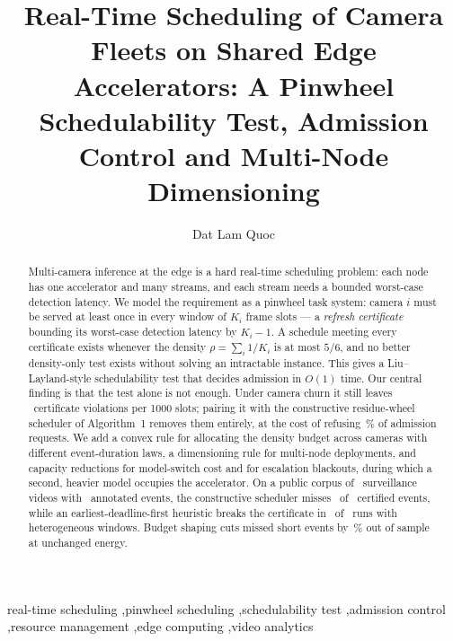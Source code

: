 \documentclass[final,5p,times,twocolumn]{elsarticle}
\theoremstyle{definition}
\newcommand{\Ki}{K_i}
\newcommand{\dens}{\rho}
\begin{document}
\begin{frontmatter}

\title{Real-Time Scheduling of Camera Fleets on Shared Edge Accelerators:
A Pinwheel Schedulability Test, Admission Control and Multi-Node Dimensioning}

\author[fsb]{Dat Lam Quoc}
\address[fsb]{FPT School of Business and Technology, FPT University,
Ho Chi Minh City, Viet Nam}

\begin{abstract}
Multi-camera inference at the edge is a hard real-time scheduling problem: each node has one
accelerator and many streams, and each stream needs a bounded worst-case detection latency. We
model the requirement as a pinwheel task system: camera $i$ must be served at least once in
every window of $\Ki$ frame slots --- a \emph{refresh certificate} bounding its worst-case
detection latency by $\Ki-1$. A schedule meeting every certificate exists whenever the density
$\dens=\sum_i 1/\Ki$ is at most $5/6$, and no better density-only test exists without solving an
intractable instance. This gives a Liu--Layland-style schedulability test that decides admission
in $O(1)$ time. Our central finding is that the test
alone is not enough. Under camera churn it still leaves \numEfiveDensViol\ certificate violations
per 1000 slots; pairing it with the constructive residue-wheel scheduler of Algorithm~1
removes them entirely, at
the cost of refusing \numEfiveResRej\,\% of admission requests. We add a convex rule for
allocating the density budget across cameras with different event-duration laws, a dimensioning
rule for multi-node deployments, and capacity reductions for model-switch cost and for
escalation blackouts, during which a second, heavier model occupies the accelerator. On a public
corpus of \numVideos\
surveillance videos with \numEvents\ annotated events, the constructive scheduler misses
\numEtwoCertMissed\ of \numEtwoCertTotal\ certified events, while an earliest-deadline-first
heuristic breaks the certificate
in \numEtwoEdfHetViolRuns\ of \numEtwoEdfHetRuns\ runs with heterogeneous windows. Budget shaping
cuts missed short events by \numHoldoutGain\,\% out of sample at unchanged energy.
\end{abstract}

\begin{keyword}
real-time scheduling \sep pinwheel scheduling \sep schedulability test \sep admission control
\sep resource management \sep edge computing \sep video analytics
\end{keyword}

\end{frontmatter}
\end{document}
